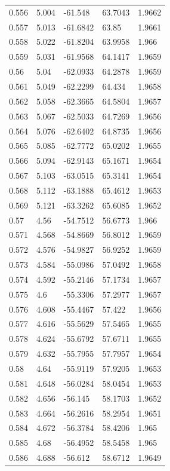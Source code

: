 \begin{tabular}{lllll}
0.556 & 5.004 & -61.548 & 63.7043 & 1.9662 \\
0.557 & 5.013 & -61.6842 & 63.85 & 1.9661 \\
0.558 & 5.022 & -61.8204 & 63.9958 & 1.966 \\
0.559 & 5.031 & -61.9568 & 64.1417 & 1.9659 \\
0.56 & 5.04 & -62.0933 & 64.2878 & 1.9659 \\
0.561 & 5.049 & -62.2299 & 64.434 & 1.9658 \\
0.562 & 5.058 & -62.3665 & 64.5804 & 1.9657 \\
0.563 & 5.067 & -62.5033 & 64.7269 & 1.9656 \\
0.564 & 5.076 & -62.6402 & 64.8735 & 1.9656 \\
0.565 & 5.085 & -62.7772 & 65.0202 & 1.9655 \\
0.566 & 5.094 & -62.9143 & 65.1671 & 1.9654 \\
0.567 & 5.103 & -63.0515 & 65.3141 & 1.9654 \\
0.568 & 5.112 & -63.1888 & 65.4612 & 1.9653 \\
0.569 & 5.121 & -63.3262 & 65.6085 & 1.9652 \\
0.57 & 4.56 & -54.7512 & 56.6773 & 1.966 \\
0.571 & 4.568 & -54.8669 & 56.8012 & 1.9659 \\
0.572 & 4.576 & -54.9827 & 56.9252 & 1.9659 \\
0.573 & 4.584 & -55.0986 & 57.0492 & 1.9658 \\
0.574 & 4.592 & -55.2146 & 57.1734 & 1.9657 \\
0.575 & 4.6 & -55.3306 & 57.2977 & 1.9657 \\
0.576 & 4.608 & -55.4467 & 57.422 & 1.9656 \\
0.577 & 4.616 & -55.5629 & 57.5465 & 1.9655 \\
0.578 & 4.624 & -55.6792 & 57.6711 & 1.9655 \\
0.579 & 4.632 & -55.7955 & 57.7957 & 1.9654 \\
0.58 & 4.64 & -55.9119 & 57.9205 & 1.9653 \\
0.581 & 4.648 & -56.0284 & 58.0454 & 1.9653 \\
0.582 & 4.656 & -56.145 & 58.1703 & 1.9652 \\
0.583 & 4.664 & -56.2616 & 58.2954 & 1.9651 \\
0.584 & 4.672 & -56.3784 & 58.4206 & 1.965 \\
0.585 & 4.68 & -56.4952 & 58.5458 & 1.965 \\
0.586 & 4.688 & -56.612 & 58.6712 & 1.9649 \\

\end{tabular}
